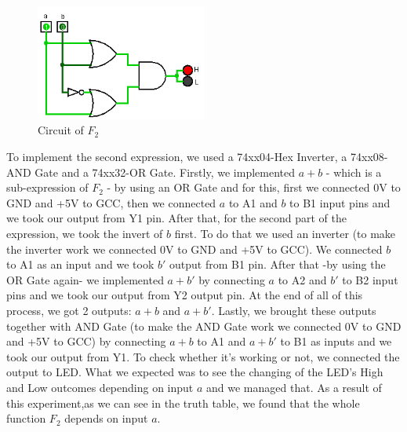 \documentclass[pdftex,12pt,a4paper]{article}
\begin{document}
\begin{figure}[ht]
	\centering
	\includegraphics[width=0.5\textwidth]{2_1_2.png}	
	\caption{Circuit of $F_2$}
	\label{fig1}
\end{figure}
To implement the second expression, we used a 74xx04-Hex Inverter, a 74xx08-AND Gate and a 74xx32-OR Gate. Firstly, we implemented $a + b$ - which is a sub-expression of $F_2$ - by using an OR Gate and for this, first we connected 0V to GND and +5V to GCC, then we connected $a$ to A1 and $b$ to B1 input pins and we took our output from Y1 pin. After that, for the second part of the expression, we took the invert of $b$ first. To do that we used an inverter (to make the inverter work we connected 0V to GND and +5V to GCC). We connected $b$ to A1 as an input and we took $b'$ output from B1 pin. After that -by using the OR Gate again- we implemented $a + b'$ by connecting $a$ to A2 and $b'$ to B2 input pins and we took our output from Y2 output pin. At the end of all of this process, we got 2 outputs: $a + b$ and $a + b'$. Lastly, we brought these outputs together with AND Gate (to make the AND Gate work we connected 0V to GND and +5V to GCC) by connecting $a + b$ to A1 and $a + b'$ to B1 as inputs and we took our output from Y1. To check whether it's working or not, we connected the output to LED. What we expected was to see the changing of the LED's High and Low outcomes depending on input $a$ and we managed that. As a result of this experiment,as we can see in the truth table, we found that the whole function $F_2$ depends on input $a$.
\end{document}
